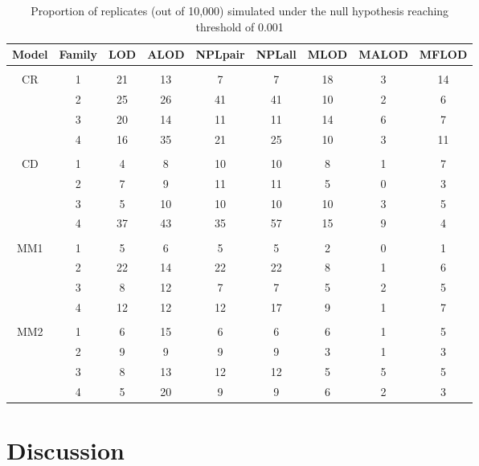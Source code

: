 \begin{table}[h]
\caption{Proportion of replicates (out of 10,000) simulated under the null
hypothesis reaching threshold of 0.001\label{lnull}}
\centering
\begin{tabular}{ccccccccc}
\\
\hline
Model & Family & LOD  &  ALOD &  NPLpair& NPLall&  MLOD &  MALOD & MFLOD\\
\hline
\\
CR    & 1      & 21   &  13   &  7      & 7     &  18   &  3     & 14\\
      & 2      & 25   &  26   &  41     & 41    &  10   &  2     & 6\\
      & 3      & 20   &  14   &  11     & 11    &  14   &  6     & 7\\
      & 4      & 16   &  35   &  21     & 25    &  10   &  3     & 11\\
\\
CD    & 1      & 4    &  8    &  10     & 10    &  8    &  1     & 7\\
      & 2      & 7    &  9    &  11     & 11    &  5    &  0     & 3\\
      & 3      & 5    &  10   &  10     & 10    &  10   &  3     & 5\\
      & 4      & 37   &  43   &  35     & 57    &  15   &  9     & 4\\
\\
MM1   & 1      & 5    &  6    &  5      & 5     &  2    &  0     & 1\\
      & 2      & 22   &  14   &  22     & 22    &  8    &  1     & 6\\
      & 3      & 8    &  12   &  7      & 7     &  5    &  2     & 5\\
      & 4      & 12   &  12   &  12     & 17    &  9    &  1     & 7\\
\\
MM2   & 1      & 6    &  15   &  6      & 6     &  6    &  1     & 5\\
      & 2      & 9    &  9    &  9      & 9     &  3    &  1     & 3\\
      & 3      & 8    &  13   &  12     & 12    &  5    &  5     & 5\\
      & 4      & 5    &  20   &  9      & 9     &  6    &  2     & 3\\
\hline
\end{tabular}
\end{table}


\section{Discussion}

